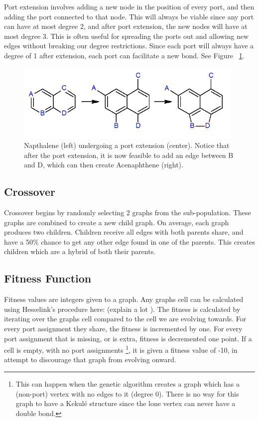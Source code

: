 \documentclass[12pt]{article}
\begin{document}
Port extension involves adding a new node in the position of every port, and then adding the port connected to that node. This will always be viable since any port can have at most degree 2, and after port extension, the new nodes will have at most degree 3. This is often useful for spreading the ports out and allowing new edges without breaking our degree restrictions. Since each port will always have a degree of 1 after extension, each port can facilitate a new bond. See Figure ~\ref{fig:portExtension}.

\begin{figure}[ht!]
\centering
\includegraphics[width=110mm]{portExtension.png}
\caption{Napthalene (left) undergoing a port extension (center). Notice that after the port extension, it is now feasible to add an edge between B and D, which can then create Acenaphthene (right).}
\label{fig:portExtension}
\end{figure}

\subsection{Crossover}

Crossover begins by randomly selecting 2 graphs from the sub-population. These graphs are combined to create a new child graph. On average, each graph produces two children. Children receive all edges with both parents share, and have a 50\% chance to get any other edge found in one of the parents. This creates children which are a hybrid of both their parents.

\subsection{Fitness Function}

Fitness values are integers given to a graph. Any graphs cell can be calculated using Hesselink's procedure here: (explain a lot ). The fitness is calculated by iterating over the graphs cell compared to the cell we are evolving towards. For every port assignment they share, the fitness is incremented by one. For every port assignment that is missing, or is extra, fitness is decremented one point. If a cell is empty, with no port assignments \footnote{This can happen when the genetic algorithm creates a graph which has a (non-port) vertex with no edges to it (degree 0). There is no way for this graph to have a Kekul\'e structure since the lone vertex can never have a double bond.}, it is given a fitness value of -10, in attempt to discourage that graph from evolving onward. 
\end{document}
